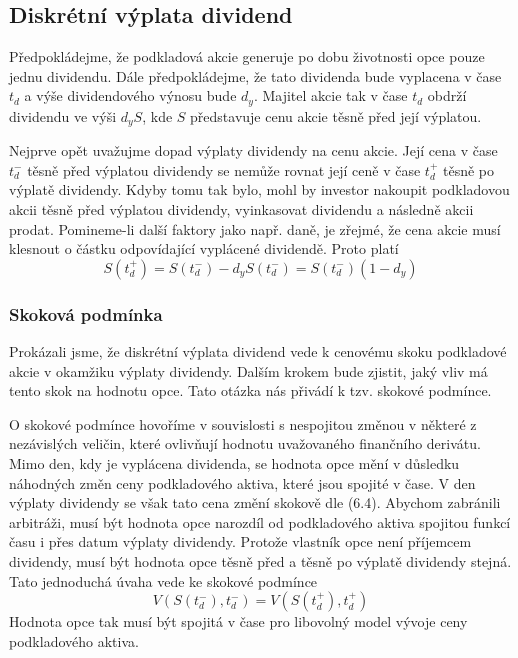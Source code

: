\documentclass[a4paper]{book}
\begin{document}
\subsection{Diskrétní výplata dividend}

Předpokládejme, že podkladová akcie generuje po dobu životnosti opce pouze jednu dividendu. Dále předpokládejme, že tato dividenda bude vyplacena v čase $t_d$ a výše dividendového výnosu bude $d_y$. Majitel akcie tak v čase $t_d$ obdrží dividendu ve výši $d_y S$, kde $S$ představuje cenu akcie těsně před její výplatou.

Nejprve opět uvažujme dopad výplaty dividendy na cenu akcie. Její cena v čase $t_d^-$ těsně před výplatou dividendy se nemůže rovnat její ceně v čase $t_d^+$ těsně po výplatě dividendy. Kdyby tomu tak bylo, mohl by investor nakoupit podkladovou akcii těsně před výplatou dividendy, vyinkasovat dividendu a následně akcii prodat. Pomineme-li další faktory jako např. daně, je zřejmé, že cena akcie musí klesnout o částku odpovídající vyplácené dividendě. Proto platí
\begin{equation}
S(t_d^+) = S(t_d^-) - d_yS(t_d^-) = S(t_d^-)(1-d_y)
\end{equation}

\subsubsection{Skoková podmínka}

Prokázali jsme, že diskrétní výplata dividend vede k cenovému skoku podkladové akcie v okamžiku výplaty dividendy. Dalším krokem bude zjistit, jaký vliv má tento skok na hodnotu opce. Tato otázka nás přivádí k tzv. skokové podmínce.

O skokové podmínce hovoříme v souvislosti s nespojitou změnou v některé z nezávislých veličin, které ovlivňují hodnotu uvažovaného finančního derivátu. Mimo den, kdy je vyplácena dividenda, se hodnota opce mění v důsledku náhodných změn ceny podkladového aktiva, které jsou spojité v čase. V den výplaty dividendy se však tato cena změní skokově dle (6.4). Abychom zabránili arbitráži, musí být hodnota opce narozdíl od podkladového aktiva spojitou funkcí času i přes datum výplaty dividendy. Protože vlastník opce není příjemcem dividendy, musí být hodnota opce těsně před a těsně po výplatě dividendy stejná. Tato jednoduchá úvaha vede ke skokové podmínce
\begin{equation}
V(S(t_d^-), t_d^-) = V(S(t_d^+), t_d^+)
\end{equation}
Hodnota opce tak musí být spojitá v čase pro libovolný model vývoje ceny podkladového aktiva.
\end{document}
